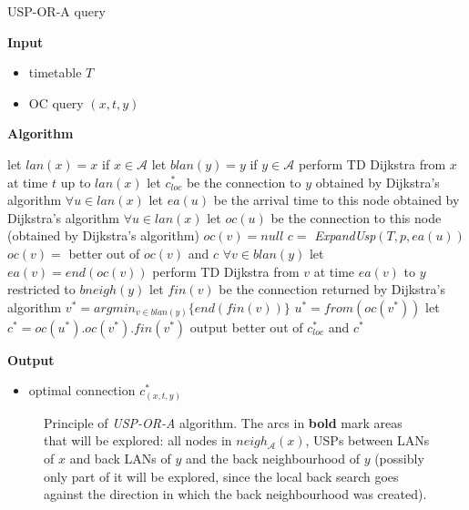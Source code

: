 	\color{algcolor}
	\begin{algorithm}[H]
		\color{inalgcolor}
		\caption{USP-OR-A query}
		\label{alg:uspora-query}
		\textbf{Input} 
		\begin{itemize}
			\item timetable $T$
			\item OC query $(x, t, y)$
		\end{itemize}
		\textbf{Algorithm}
		\begin{algorithmic}
			\STATE let $lan(x) = x$ if $x \in \mathcal{A}$
			\STATE let $blan(y) = y$ if $y \in \mathcal{A}$
			\STATE {}
			\STATE perform TD Dijkstra from $x$ at time $t$ up to $lan(x)$
				\STATE let $c_{loc}^{*}$ be the connection to $y$ obtained by Dijkstra's algorithm 
			\ENDIF
			\STATE $\forall u \in lan(x)$ let $ea(u)$ be the arrival time to this node obtained by Dijkstra's algorithm
			\STATE $\forall u \in lan(x)$ let $oc(u)$ be the connection to this node (obtained by Dijkstra's algorithm)
			\STATE {}
				\STATE $oc(v) = null$
						\STATE $c =$ \textit{ExpandUsp}$(T, p, ea(u))$
						\STATE $oc(v) =$ better out of $oc(v)$ and $c$
					\ENDFOR
				\ENDFOR
			\ENDFOR
			\STATE $\forall v \in blan(y)$ let $ea(v) = end(oc(v))$
			\STATE {}
				\STATE perform TD Dijkstra from $v$ at time $ea(v)$ to $y$ restricted to $bneigh(y)$
				\STATE let $fin(v)$ be the connection returned by Dijkstra's algorithm
			\ENDFOR
			\STATE $v^{*} = argmin_{v \in blan(y)} \{end(fin(v))\}$
			\STATE $u^{*} = from(oc(v^{*}))$
			\STATE let $c^{*} = oc(u^{*}) . oc(v^{*}) . fin(v^{*})$ 
			\STATE output better out of $c_{loc}^{*}$ and $c^{*}$
		\end{algorithmic}
		\textbf{Output}
		\begin{itemize}
			\item optimal connection $c_{(x, t, y)}^{*}$
		\end{itemize}
	\end{algorithm}
	\color{black}
	
	\begin{figure}[h!]
		\begin{center}
		\end{center}
		\caption{\label{fig:uspora} Principle of \textit{USP-OR-A} algorithm. The arcs in \textbf{bold} mark areas that will be explored: all nodes in $neigh_{\mathcal{A}}(x)$, USPs between LANs of $x$ and back LANs of $y$ and the back neighbourhood of $y$ (possibly only part of it will be explored, since the local back search goes against the direction in which the back neighbourhood was created).}
	\end{figure}
	
